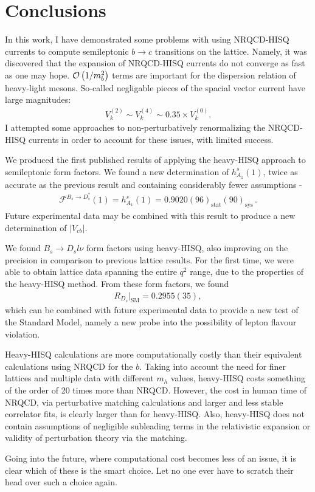 ﻿\chapter{Conclusions}

In this work, I have demonstrated some problems with using NRQCD-HISQ currents to compute semileptonic $b\to c$ transitions on the lattice. Namely, it was discovered that the expansion of NRQCD-HISQ currents do not converge as fast as one may hope. $\mathcal{O}\left( 1/m_b^2 \right)$ terms are important for the dispersion relation of heavy-light mesons. So-called negligable pieces of the spacial vector current have large magnitudes:
\begin{align}
  V_k^{(2)}\sim V_k^{(4)} \sim 0.35\times V_k^{(0)}.
\end{align}
I attempted some approaches to non-perturbatively renormalizing the NRQCD-HISQ currents in order to account for these issues, with limited success. 

We produced the first published results of applying the heavy-HISQ approach to semileptonic form factors. We found a new determination of $h_{A_1}^s(1)$, twice as accurate as the previous result and containing considerably fewer assumptions -
\begin{align}
  \mathcal{F}^{B_s\to D_s^*}(1) = h^s_{A_1}(1) = 0.9020(96)_{\text{stat}}(90)_{\text{sys}}\,.
\end{align}
Future experimental data may be combined with this result to produce a new determination of $|V_{cb}|$.

We found $B_s\to D_sl\nu$ form factors using heavy-HISQ, also improving on the precision in comparison to previous lattice results. For the first time, we were able to obtain lattice data spanning the entire $q^2$ range, due to the properties of the heavy-HISQ method. From these form factors, we found
\begin{align}
  R_{D_s}|_{\text{SM}} = 0.2955(35),
\end{align}
which can be combined with future experimental data to provide a new test of the Standard Model, namely a new probe into the possibility of lepton flavour violation.

Heavy-HISQ calculations are more computationally costly than their equivalent calculations using NRQCD for the $b$. Taking into account the need for finer lattices and multiple data with different $m_h$ values, heavy-HISQ costs something of the order of 20 times more than NRQCD. However, the cost in human time of NRQCD, via perturbative matching calculations and larger and less stable correlator fits, is clearly larger than for heavy-HISQ. Also, heavy-HISQ does not contain assumptions of negligible subleading terms in the relativistic expansion or validity of perturbation theory via the matching.

Going into the future, where computational cost becomes less of an issue, it is clear which of these is the smart choice. Let no one ever have to scratch their head over such a choice again.
